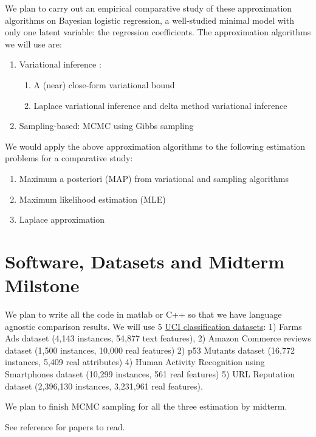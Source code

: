 \documentclass[a4paper, 10pt]{article}
\begin{document}
We plan to carry out an empirical comparative study of these approximation 
algorithms on Bayesian logistic regression, a well-studied minimal model with 
only one latent variable: the regression coefficients. The approximation 
algorithms we will use are:
\vspace{-5pt}
\begin{enumerate}
  \item Variational inference \cite{RePEc:bes:jnlasa:v:105:i:489:y:2010:p:324-335}:
    \begin{enumerate}
      \item A (near) close-form variational bound \cite{Jaakkola96avariational}
      \item Laplace variational inference and delta method variational 
      inference \cite{2012arXiv1209.4360W}
    \end{enumerate}
    \item Sampling-based: MCMC using Gibbs sampling
\end{enumerate}
\vspace{-5pt}
We would apply the above approximation algorithms to the following estimation 
problems for a comparative study:
\vspace{-5pt}
\begin{enumerate}
  \item Maximum a posteriori (MAP) from variational and sampling algorithms
  \item Maximum likelihood estimation (MLE)
  \item Laplace approximation
\end{enumerate}
\vspace{-5pt}
\section {Software, Datasets and Midterm Milstone}
\vspace{-5pt}
We plan to write all the code in matlab or C++ so that we have language agnostic 
comparison results. We will use 5 
\href{http://archive.ics.uci.edu/ml/datasets.html}{UCI classification datasets}: 
1) Farms Ads dataset (4,143 instances, 54,877 text features), 2) Amazon Commerce 
reviews dataset (1,500 instances, 10,000 real features) 2) p53 Mutants dataset 
(16,772 instances, 5,409 real attributes) 4) Human Activity Recognition using 
Smartphones dataset (10,299 instances, 561 real features) 5) URL Reputation 
dataset (2,396,130 instances, 3,231,961 real features).

We plan to finish MCMC sampling for all the three estimation by midterm.

See reference for papers to read.



\end{document}
